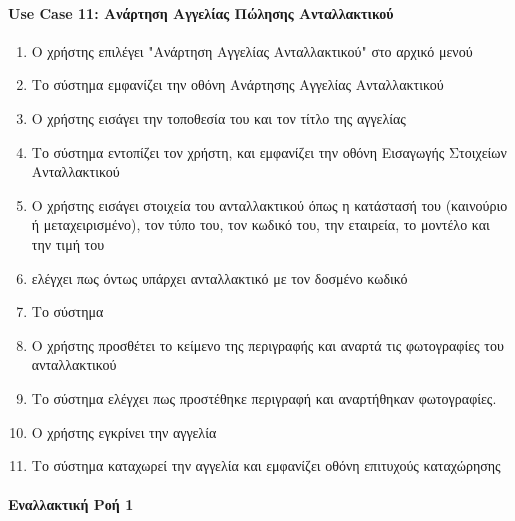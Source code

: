 \documentclass{../ol-softwaremanual}
\begin{document}
	
	
	\paragraph{\en Use Case 11: \gr Ανάρτηση Αγγελίας Πώλησης Ανταλλακτικού \gr}
	
	\begin{enumerate}
		\item Ο χρήστης επιλέγει \en"\gr Ανάρτηση Αγγελίας Ανταλλακτικού\en" \gr στο αρχικό μενού
		\item Το σύστημα εμφανίζει την οθόνη Ανάρτησης Αγγελίας Ανταλλακτικού
		\item Ο χρήστης εισάγει την τοποθεσία του και τον τίτλο της αγγελίας		
		\item Το σύστημα εντοπίζει τον χρήστη,  και εμφανίζει την οθόνη Εισαγωγής Στοιχείων Ανταλλακτικού		
		\item Ο χρήστης εισάγει στοιχεία του ανταλλακτικού όπως η κατάστασή του (καινούριο ή μεταχειρισμένο), τον τύπο του, τον κωδικό του, την εταιρεία, το μοντέλο και την τιμή του		
		\item {} ελέγχει πως όντως υπάρχει ανταλλακτικό με τον δοσμένο κωδικό		
		\item Το σύστημα 
		\item Ο χρήστης προσθέτει το κείμενο της περιγραφής και αναρτά τις φωτογραφίες του ανταλλακτικού		
		\item Το σύστημα ελέγχει πως προστέθηκε περιγραφή και αναρτήθηκαν φωτογραφίες. 		
		\item Ο χρήστης εγκρίνει την αγγελία		
		\item Το σύστημα καταχωρεί την αγγελία και εμφανίζει οθόνη επιτυχούς καταχώρησης
	\end{enumerate}
	
	
	\paragraph{Εναλλακτική Ροή 1}
	
\end{document}
